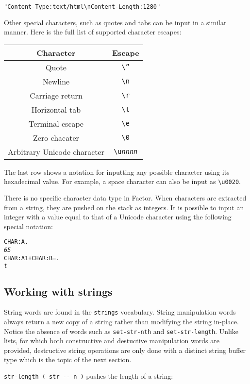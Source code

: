 \documentclass[english]{article}
\providecommand{\tabularnewline}{\\}
\begin{document}
\begin{alltt}
"Content-Type: text/html\textbackslash{}nContent-Length: 1280"
\end{alltt}
Other special characters, such as quotes and tabs can be input in
a similar manner. Here is the full list of supported character escapes:

\begin{tabular}{|c|c|}
\hline 
Character&
Escape\tabularnewline
\hline
\hline 
Quote&
\texttt{\textbackslash{}''}\tabularnewline
\hline 
Newline&
\texttt{\textbackslash{}n}\tabularnewline
\hline 
Carriage return&
\texttt{\textbackslash{}r}\tabularnewline
\hline 
Horizontal tab&
\texttt{\textbackslash{}t}\tabularnewline
\hline 
Terminal escape&
\texttt{\textbackslash{}e}\tabularnewline
\hline 
Zero chacater&
\texttt{\textbackslash{}0}\tabularnewline
\hline 
Arbitrary Unicode character&
\texttt{\textbackslash{}u}\texttt{\emph{nnnn}}\tabularnewline
\hline
\end{tabular}

The last row shows a notation for inputting any possible character
using its hexadecimal value. For example, a space character can also
be input as \texttt{\textbackslash{}u0020}.

There is no specific character data type in Factor. When characters
are extracted from a string, they are pushed on the stack as integers.
It is possible to input an integer with a value equal to that of a
Unicode character using the following special notation:

\begin{alltt}
CHAR: A .
\emph{65}
CHAR: A 1 + CHAR: B = .
\emph{t}
\end{alltt}

\subsection{Working with strings}

String words are found in the \texttt{strings} vocabulary. String
manipulation words always return a new copy of a string rather than
modifying the string in-place. Notice the absence of words such as
\texttt{set-str-nth} and \texttt{set-str-length}. Unlike lists, for
which both constructive and destuctive manipulation words are provided,
destructive string operations are only done with a distinct string
buffer type which is the topic of the next section.

\texttt{str-length ( str -{}- n )} pushes the length of a string:
\end{document}
